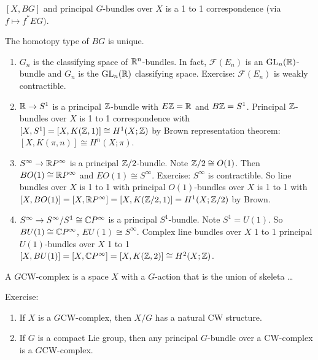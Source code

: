 \documentclass[12pt,class=article,crop=false]{standalone}
\begin{document}
\begin{thm}
	$ [X,BG]$ and principal  $ G$-bundles over  $ X$ is a 1 to 1 correspondence (via $ f\mapsto f^* EG)$.
\end{thm}
\begin{thm}
The homotopy type of $ BG$ is unique.
\end{thm}
\begin{eg}
\begin{enumerate}[label=(\arabic*)]
	\item $ G_n$ is the classifying space of $ \mathbb{R}^{n}$-bundles. In fact, $ \mathcal{ F}(E_n)$ is an $ \text{GL}_{ n}(\mathbb{R}) $-bundle and $ G_n$ is the $ \text{GL}_{ n}(\mathbb{R}) $ classifying space. Exercise: $ \mathcal{ F}(E_n)$ is weakly contractible.
	\item $ \mathbb{R} \to S^{1}$ is a principal $ \mathbb{Z}$-bundle with $ E \mathbb{Z} = \mathbb{R}$ and $ B\mathbb{Z} = S^{1}$. Principal $ \mathbb{Z}$-bundles over $ X$ is 1 to 1 correspondence with  $ [X,S^{1}] = [X,K(\mathbb{Z},1)] \cong H^{1}(X;\mathbb{Z})$ by Brown representation theorem: $ [X,K(\pi,n)] \cong H^{n}(X; \pi)$.
	\item $ S^{\infty} \to \mathbb{R} P^{\infty}$ is a principal $ \mathbb{Z} /2$-bundle. Note $ \mathbb{Z} /2 \cong O(1)$. Then $ BO(1) \cong \mathbb{R} P^{\infty}$ and $ EO(1) \cong S^{\infty}$. Exercise: $ S^{\infty}$ is contractible. So line bundles over $ X$ is 1 to 1 with principal  $ O(1)$-bundles over $ X$ is 1 to 1 with  $ [X,BO(1)] = [X, \mathbb{R} P^{\infty}] = [X,K(\mathbb{Z} /2,1)] = H^{1}(X; \mathbb{Z} /2)$ by Brown.
	\item $ S^{\infty} \to S^{\infty} / S^{1} \cong \mathbb{C} P^{\infty}$ is a principal $ S^{1}$-bundle. Note $ S^{1} = U(1)$. So $ BU(1) \cong \mathbb{C} P^{\infty}$, $ EU(1) \cong S^{\infty}$. Complex line bundles over $ X$ 1 to 1 principal $ U(1)$-bundles over  $ X$ 1 to 1  $ [X,BU(1)]=[X, \mathbb{C} P^{\infty}] = [X, K(\mathbb{Z},2)] \cong H^{2}(X;\mathbb{Z})$.
\end{enumerate}
\end{eg}

\begin{defn}
A $ G$CW-complex is a space $ X$ with a  $ G$-action that is the union of skeleta \ldots
\end{defn}
Exercise:
\begin{enumerate}[label=(\arabic*)]
	\item If $ X$ is a $ G$CW-complex, then  $ X /G$ has a natural  CW structure.
	\item If $ G$ is a compact Lie group, then any principal  $ G$-bundle over a  CW-complex is a $ G$CW-complex.
\end{enumerate}
\end{document}
